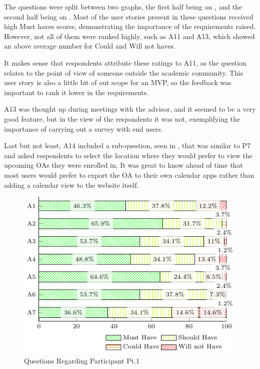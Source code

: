The questions were split between two graphs, the first half being on , and the second half being on . Most of the user stories present in these questions received high Must haves scores, demonstrating the importance of the requirements raised. However, not all of them were ranked highly, such as A11 and A13, which showed an above average number for Could and Will not haves.

It makes sense that respondents attribute these ratings to A11, as the question relates to the point of view of someone outside the academic community. This user story is also a little bit of out scope for an \ac{MVP}, so the feedback was important to rank it lower in the requirements.

A13 was thought up during meetings with the advisor, and it seemed to be a very good feature, but in the view of the respondents it was not, exemplifying the importance of carrying out a survey with end users.

Last but not least, A14 included a sub-question, seen in , that was similar to P7 and asked respondents to select the location where they would prefer to view the upcoming \acp{OA} they were enrolled in. It was great to know ahead of time that most users would prefer to export the \ac{OA} to their own calendar apps rather than adding a calendar view to the website itself.

\begin{figure}[!htb]
  \caption{Questions Regarding Participant Pt.1}\label{fig:participant-1}
  \begin{center}
    \includegraphics[width=.7\textwidth]{img/5-questions-participant-1.pdf}
  \end{center}
\end{figure}

